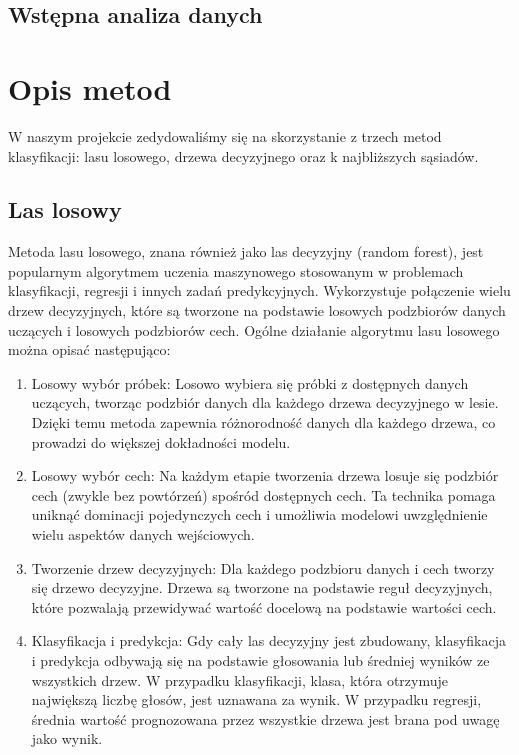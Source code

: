 \documentclass{article}
\begin{document}
\subsection{Wstępna analiza danych}

\section{Opis metod}
W naszym projekcie zedydowaliśmy się na skorzystanie z trzech metod klasyfikacji: lasu losowego, drzewa decyzyjnego oraz k najbliższych sąsiadów.
\subsection{Las losowy}
Metoda lasu losowego, znana również jako las decyzyjny (random forest), jest popularnym algorytmem uczenia maszynowego stosowanym w problemach klasyfikacji, regresji i innych zadań predykcyjnych. Wykorzystuje połączenie wielu drzew decyzyjnych, które są tworzone na podstawie losowych podzbiorów danych uczących i losowych podzbiorów cech. \newline
Ogólne działanie algorytmu lasu losowego można opisać następująco:
\begin{enumerate}
    \item Losowy wybór próbek: Losowo wybiera się próbki z dostępnych danych uczących, tworząc podzbiór danych dla każdego drzewa decyzyjnego w lesie. Dzięki temu metoda zapewnia różnorodność danych dla każdego drzewa, co prowadzi do większej dokładności modelu.

    \item Losowy wybór cech: Na każdym etapie tworzenia drzewa losuje się podzbiór cech (zwykle bez powtórzeń) spośród dostępnych cech. Ta technika pomaga uniknąć dominacji pojedynczych cech i umożliwia modelowi uwzględnienie wielu aspektów danych wejściowych.

    \item Tworzenie drzew decyzyjnych: Dla każdego podzbioru danych i cech tworzy się drzewo decyzyjne. Drzewa są tworzone na podstawie reguł decyzyjnych, które pozwalają przewidywać wartość docelową na podstawie wartości cech.

    \item Klasyfikacja i predykcja: Gdy cały las decyzyjny jest zbudowany, klasyfikacja i predykcja odbywają się na podstawie głosowania lub średniej wyników ze wszystkich drzew. W przypadku klasyfikacji, klasa, która otrzymuje największą liczbę głosów, jest uznawana za wynik. W przypadku regresji, średnia wartość prognozowana przez wszystkie drzewa jest brana pod uwagę jako wynik.
\end{enumerate}
\end{document}
